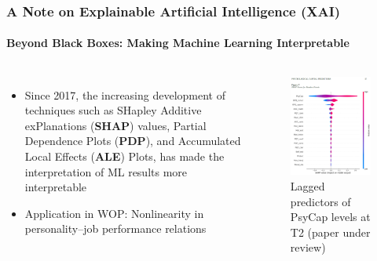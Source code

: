 \documentclass{beamer}
\begin{document}
\begin{frame}
	\frametitle{A Note on Explainable Artificial Intelligence (XAI)}
	\framesubtitle{Beyond Black Boxes: Making Machine Learning Interpretable}
	\begin{columns}[c] 
		{\small
		\begin{itemize}
			\item  Since 2017, the increasing development of techniques such as SHapley Additive exPlanations (\textbf{SHAP}) values, Partial Dependence Plots (\textbf{PDP}), and Accumulated Local Effects (\textbf{ALE}) Plots, has made the interpretation of ML results more interpretable {\scriptsize \parencite{molnar_XAI}}
			\item Application in WOP: Nonlinearity in personality–job performance relations {\scriptsize \parencite{song_XAI}}
		\end{itemize}
	}
	\begin{figure}
		\centering
		\includegraphics[width=0.8\linewidth]{figs/shap_PsyCap.png}
		\caption{{\scriptsize Lagged predictors of PsyCap levels at T2 (paper under review)}}
		\label{fig:shap_PsyCap}
	\end{figure}
	\end{columns}
\end{frame}
\end{document}
